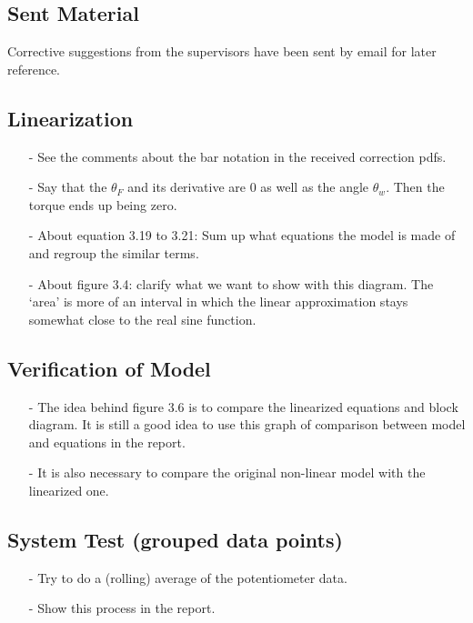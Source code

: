 \subsection{Sent Material}
Corrective suggestions from the supervisors have been sent by email for later reference.

\subsection{Linearization}
\begin{itemize}
  \item[-] See the comments about the bar notation in the received correction pdfs.
  \item[-] Say that the $\theta_F$ and its derivative are 0 as well as the angle $\theta_w$. Then the torque ends up being zero.
  \item[-] About equation 3.19 to 3.21: Sum up what equations the model is made of and regroup the similar terms.
  \item[-] About figure 3.4: clarify what we want to show with this diagram. The `area' is more of an interval in which the linear approximation stays somewhat close to the real sine function.
\end{itemize}

\subsection{Verification of Model}
\begin{itemize}
  \item[-] The idea behind figure 3.6 is to compare the linearized equations and block diagram. It is still a good idea to use this graph of comparison between model and equations in the report.
  \item[-] It is also necessary to compare the original non-linear model with the linearized one.
\end{itemize}

\subsection{System Test (grouped data points)}
\begin{itemize}
  \item[-] Try to do a (rolling) average of the potentiometer data.
  \item[-] Show this process in the report.
\end{itemize}


